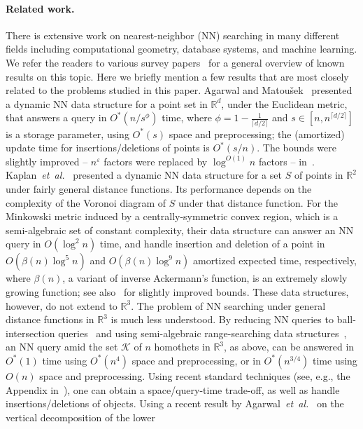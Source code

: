 \documentclass[11pt]{article}
\def\reals{{\mathbb R}}
\def\eps{{\varepsilon}}
\def\K{\mathcal{K}}
\def\ceil#1{\lceil #1\rceil}
\def\etal{\textsl{et~al.}}
\theoremstyle{definition}
\begin{document}
\paragraph{Related work.}
\fi
There is extensive work on nearest-neighbor (NN) searching in many different fields including
computational geometry, database systems, and machine learning. We refer the readers to 
various survey papers~\cite{AE99,AI17,Cl} for a general overview of known results on this topic. 
Here we briefly mention a few results that are most closely related to the problems studied 
in this paper. Agarwal and Matou\v{s}ek~\cite{AM95} presented a dynamic NN data structure for 
a point set in $\reals^d$, under the Euclidean metric, that answers a query in $O^*(n/s^\phi)$ 
time, where $\phi=1-\tfrac{1}{\ceil{d/2}}$ and $s \in [n,n^{\ceil{d/2}}]$ is a storage parameter, 
using $O^*(s)$ space and preprocessing; the (amortized) update time for insertions/deletions of 
points is $O^*(s/n)$. The bounds were slightly improved -- $n^\eps$ factors were replaced by 
$\log^{O(1)}n$ factors -- in~\cite{Chan:le,KMRSS}.
Kaplan~\etal~\cite{KMRSS} presented a dynamic NN data structure for a set $S$ of points in 
$\reals^2$ under fairly general distance functions. Its performance depends on the 
complexity of the Voronoi diagram of $S$ under that distance function. For the Minkowski 
metric induced by a centrally-symmetric convex region, which is a semi-algebraic set of
constant complexity, their data structure can answer an NN query in $O(\log^2n)$ time, and handle 
insertion and deletion of a point in $O(\beta(n)\log^5n )$ and $O(\beta(n)\log^9n)$ 
amortized expected time, respectively, where $\beta(n)$, a variant of inverse Ackermann's function, is
an extremely slowly growing function; see also~\cite{Liu} for slightly improved bounds. 
These data structures, however, do not extend to $\reals^3$.
%
The problem of NN searching under general distance functions
in $\reals^3$ is much less understood.
By reducing NN queries to ball-intersection queries~\cite{AM93} and 
using semi-algebraic range-searching data structures~\cite{AAEZ,MP,AAEKS}, an NN query 
amid the set $\K$ of $n$ homothets in $\reals^3$, as above, can be answered in $O^*(1)$ time 
using $O^*(n^4)$ space and preprocessing, or in $O^*(n^{3/4})$ time using $O(n)$ space and preprocessing. 
Using recent standard techniques (see, e.g., the Appendix in~\cite{AAEKS}),
one can obtain a space/query-time trade-off, as well as handle insertions/deletions of objects.
Using a recent result by Agarwal~\etal~\cite{AES:vd} on the vertical decomposition of the lower 
\end{document}

